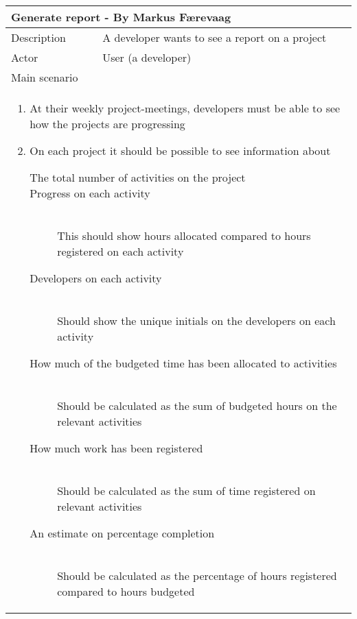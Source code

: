 \begin{table}[H]
  \begin{tabular}{|l|l|}
    \multicolumn{2}{l}{
      \bf{Generate report - By Markus Færevaag}
    }
    \\ \hline
    Description & A developer wants to see a report on a project
    \\ \hline
    Actor & User (a developer)
    \\ \hline \multicolumn{2}{|l|}{
      Main scenario 
    }
    \\ \hline \multicolumn{2}{|l|}{ \parbox{\textwidth}{
        \begin{enumerate}        
        \item{At their weekly project-meetings, developers must be able to see how the projects are progressing}
        \item{On each project it should be possible to see information about}
          \begin{description}
          \item[The total number of activities on the project] {}

          \item[Progress on each activity] \hfill \\
            {This should show hours allocated compared to hours registered on each activity}
			
			\item[Developers on each activity]\hfill \\
            {Should show the unique initials on the developers on each activity}

          \item[How much of the budgeted time has been allocated to activities]\hfill \\
            {Should be calculated as the sum of budgeted hours on the relevant activities}

          \item[How much work has been registered]\hfill \\
            {Should be calculated as the sum of time registered on relevant activities}

          \item[An estimate on percentage completion]\hfill \\
            {Should be calculated as the percentage of hours registered compared to hours budgeted}


\end{description}
\end{enumerate}}}
\end{tabular}
\end{table}
